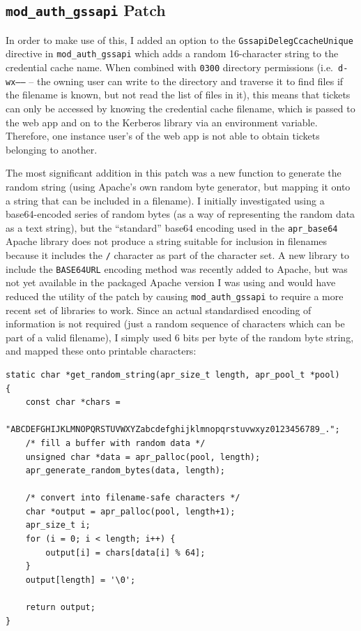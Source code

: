 \documentclass[12pt]{report}
\begin{document}
\subsection{\texttt{mod\_auth\_gssapi} Patch}
In order to make use of this, I added an option to the \texttt{GssapiDelegCcacheUnique} directive in \verb+mod_auth_gssapi+ which adds a random 16-character string to the credential cache name. When combined with \texttt{0300} directory permissions (i.e.\ \texttt{d-wx------} -- the owning user can write to the directory and traverse it to find files if the filename is known, but not read the list of files in it), this means that tickets can only be accessed by knowing the credential cache filename, which is passed to the web app and on to the Kerberos library via an environment variable. Therefore, one instance user's of the web app is not able to obtain tickets belonging to another.

The most significant addition in this patch was a new function to generate the random string (using Apache's own random byte generator, but mapping it onto a string that can be included in a filename). I initially investigated using a base64-encoded series of random bytes (as a way of representing the random data as a text string), but the ``standard'' base64 encoding used in the \verb+apr_base64+ Apache library does not produce a string suitable for inclusion in filenames because it includes the \verb+/+ character as part of the character set\cite{RFC4648}. A new library to include the \texttt{BASE64URL} encoding method was recently added to Apache\cite{Apache-base64-commit}, but was not yet available in the packaged Apache version I was using and would have reduced the utility of the patch by causing \verb+mod_auth_gssapi+ to require a more recent set of libraries to work. Since an actual standardised encoding of information is not required (just a random sequence of characters which can be part of a valid filename), I simply used 6 bits per byte of the random byte string, and mapped these onto printable characters:

\begin{verbatim}
static char *get_random_string(apr_size_t length, apr_pool_t *pool)
{
    const char *chars =
      "ABCDEFGHIJKLMNOPQRSTUVWXYZabcdefghijklmnopqrstuvwxyz0123456789_.";
    /* fill a buffer with random data */
    unsigned char *data = apr_palloc(pool, length);
    apr_generate_random_bytes(data, length);

    /* convert into filename-safe characters */
    char *output = apr_palloc(pool, length+1);
    apr_size_t i;
    for (i = 0; i < length; i++) {
        output[i] = chars[data[i] % 64];
    }
    output[length] = '\0';

    return output;
}
\end{verbatim}
\end{document}
